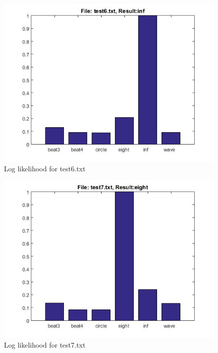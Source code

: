 \documentclass[fleqn,10pt]{SelfArx} %
\begin{document}
\begin{figure}[hbtp]
\centering
\includegraphics[scale=0.45]{test6.jpg}
\caption{Log likelihood for test6.txt}
\label{fig:test6}
\end{figure}

\begin{figure}[hbtp]
\centering
\includegraphics[scale=0.45]{test7.jpg}
\caption{Log likelihood for test7.txt}
\label{fig:test7}
\end{figure}
\end{document}
